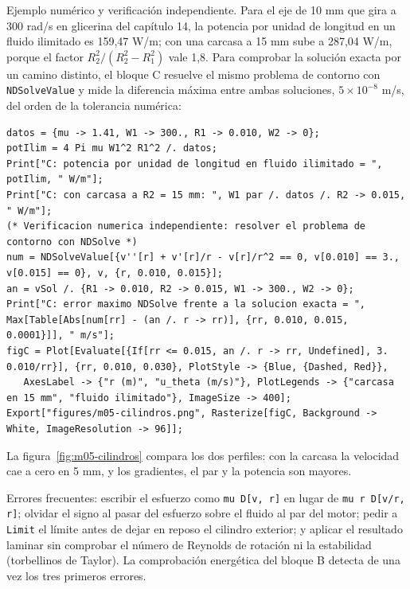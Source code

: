 \documentclass[10pt,openany]{book}
\begin{document}
Ejemplo numérico y verificación independiente. Para el eje de 10 mm que gira a 300 rad/s en glicerina del capítulo 14, la potencia por unidad de longitud en un fluido ilimitado es 159,47 W/m; con una carcasa a 15 mm sube a 287,04 W/m, porque el factor \(R_2^{2}/(R_2^{2} - R_1^{2})\) vale 1,8. Para comprobar la solución exacta por un camino distinto, el bloque C resuelve el mismo problema de contorno con \texttt{NDSolveValue} y mide la diferencia máxima entre ambas soluciones, \(5\times 10^{-8}\) m/s, del orden de la tolerancia numérica:
\begin{lstlisting}[style=studium]
datos = {mu -> 1.41, W1 -> 300., R1 -> 0.010, W2 -> 0};
potIlim = 4 Pi mu W1^2 R1^2 /. datos;
Print["C: potencia por unidad de longitud en fluido ilimitado = ", potIlim, " W/m"];
Print["C: con carcasa a R2 = 15 mm: ", W1 par /. datos /. R2 -> 0.015, " W/m"];
(* Verificacion numerica independiente: resolver el problema de contorno con NDSolve *)
num = NDSolveValue[{v''[r] + v'[r]/r - v[r]/r^2 == 0, v[0.010] == 3., v[0.015] == 0}, v, {r, 0.010, 0.015}];
an = vSol /. {R1 -> 0.010, R2 -> 0.015, W1 -> 300., W2 -> 0};
Print["C: error maximo NDSolve frente a la solucion exacta = ", Max[Table[Abs[num[rr] - (an /. r -> rr)], {rr, 0.010, 0.015, 0.0001}]], " m/s"];
figC = Plot[Evaluate[{If[rr <= 0.015, an /. r -> rr, Undefined], 3. 0.010/rr}], {rr, 0.010, 0.030}, PlotStyle -> {Blue, {Dashed, Red}},
   AxesLabel -> {"r (m)", "u_theta (m/s)"}, PlotLegends -> {"carcasa en 15 mm", "fluido ilimitado"}, ImageSize -> 400];
Export["figures/m05-cilindros.png", Rasterize[figC, Background -> White, ImageResolution -> 96]];
\end{lstlisting}
La figura~\ref{fig:m05-cilindros} compara los dos perfiles: con la carcasa la velocidad cae a cero en 5 mm, y los gradientes, el par y la potencia son mayores.

\begin{tcolorbox}[title={Consejo}, studiumtip, breakable]

Errores frecuentes: escribir el esfuerzo como \texttt{mu D[v, r]} en lugar de \texttt{mu r D[v/r, r]}; olvidar el signo al pasar del esfuerzo sobre el fluido al par del motor; pedir a \texttt{Limit} el límite antes de dejar en reposo el cilindro exterior; y aplicar el resultado laminar sin comprobar el número de Reynolds de rotación ni la estabilidad (torbellinos de Taylor). La comprobación energética del bloque B detecta de una vez los tres primeros errores.
\end{tcolorbox}
\end{document}
